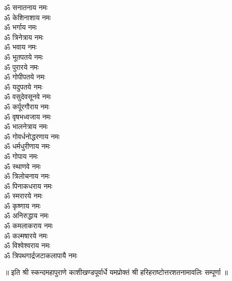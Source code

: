 \begin{multicols}{2}
\begin{flushleft}
ॐ सनातनाय नमः\\
ॐ केशिनाशाय नमः\\
ॐ भर्गाय नमः\\
ॐ त्रिनेत्राय नमः\\
ॐ भवाय नमः\\
ॐ भूतपतये नमः\\
ॐ पुरारये नमः\\
ॐ गोपीपतये नमः\hfill{}\\
ॐ यदुपतये नमः\\
ॐ वसुदेवसूनवे नमः\\
ॐ कर्पूरगौराय नमः\\
ॐ वृषभध्वजाय नमः\\
ॐ भालनेत्राय नमः\\
ॐ गोवर्धनोद्धरणाय नमः\\
ॐ धर्मधुरीणाय नमः\\
ॐ गोपाय नमः\\
ॐ स्थाणवे नमः\\
ॐ त्रिलोचनाय नमः\hfill{}\\
ॐ पिनाकधराय नमः\\
ॐ स्मरारये नमः\\
ॐ कृष्णाय नमः\\
ॐ अनिरुद्धाय नमः\\
ॐ कमलाकराय नमः\\
ॐ कल्मषारये नमः\\
ॐ विश्वेश्वराय नमः\\
ॐ त्रिपथगार्द्रजटाकलापायै नमः\\
\end{flushleft}
\end{multicols}
\centerline{॥ इति श्री स्कन्दमहापुराणे काशीखण्डपूर्वार्धे यमप्रोक्तं श्री हरिहराष्टोत्तरशतनामावलिः सम्पूर्णा ॥}
